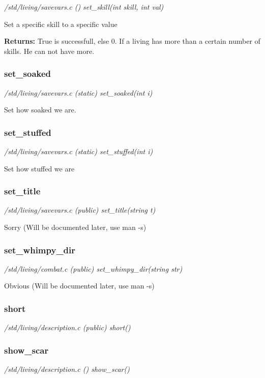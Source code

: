 {\em /std/living/savevars.c () set\_skill(int skill, int val)}

Set a specific skill to a specific value

{\bf Returns:}  True is successfull, else 0. If a living has more than
a certain number of skills. He can not have more.


\subsubsection{set\_soaked}

{\em /std/living/savevars.c (static) set\_soaked(int i)}

Set how soaked we are.


\subsubsection{set\_stuffed}

{\em /std/living/savevars.c (static) set\_stuffed(int i)}

Set how stuffed we are


\subsubsection{set\_title}

{\em /std/living/savevars.c (public) set\_title(string t)}

Sorry (Will be documented later, use man -s)


\subsubsection{set\_whimpy\_dir}

{\em /std/living/combat.c (public) set\_whimpy\_dir(string str)}

Obvious (Will be documented later, use man -s)


\subsubsection{short}

{\em /std/living/description.c (public) short()}



\subsubsection{show\_scar}

{\em /std/living/description.c () show\_scar()}

